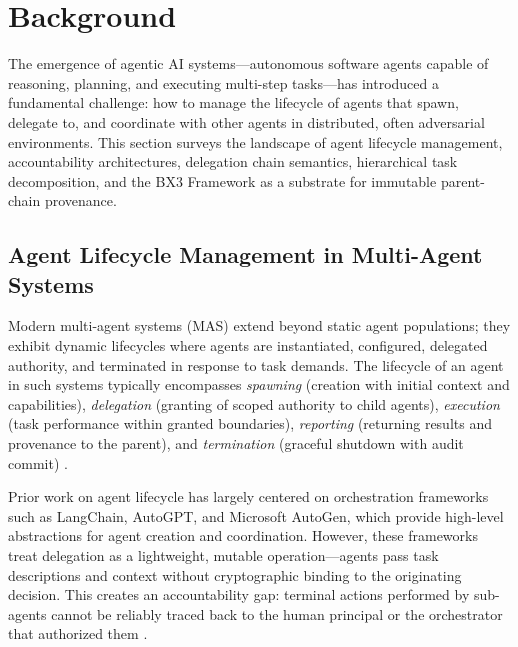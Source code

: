 \section{Background}

The emergence of agentic AI systems—autonomous software agents capable of reasoning, planning, and executing multi-step tasks—has introduced a fundamental challenge: how to manage the lifecycle of agents that spawn, delegate to, and coordinate with other agents in distributed, often adversarial environments. This section surveys the landscape of agent lifecycle management, accountability architectures, delegation chain semantics, hierarchical task decomposition, and the BX3 Framework as a substrate for immutable parent-chain provenance.


\subsection{Agent Lifecycle Management in Multi-Agent Systems}

Modern multi-agent systems (MAS) extend beyond static agent populations; they exhibit dynamic lifecycles where agents are instantiated, configured, delegated authority, and terminated in response to task demands. The lifecycle of an agent in such systems typically encompasses \emph{spawning} (creation with initial context and capabilities), \emph{delegation} (granting of scoped authority to child agents), \emph{execution} (task performance within granted boundaries), \emph{reporting} (returning results and provenance to the parent), and \emph{termination} (graceful shutdown with audit commit) \cite{SentinelAgent:2026}.

Prior work on agent lifecycle has largely centered on orchestration frameworks such as LangChain, AutoGPT, and Microsoft AutoGen, which provide high-level abstractions for agent creation and coordination. However, these frameworks treat delegation as a lightweight, mutable operation—agents pass task descriptions and context without cryptographic binding to the originating decision. This creates an accountability gap: terminal actions performed by sub-agents cannot be reliably traced back to the human principal or the orchestrator that authorized them \cite{HDP:2026}.

